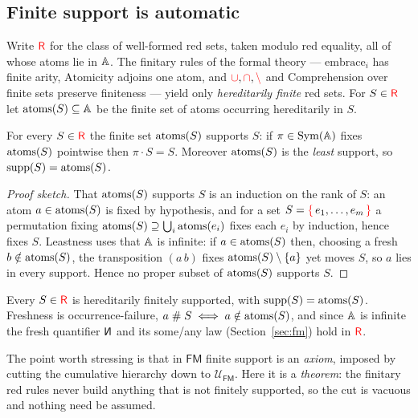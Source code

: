 \subsection{Finite support is automatic}
\label{sec:fmmodel:support}

Write $\textcolor{red}{\mathsf{R}}$ for the class of well-formed red sets, taken modulo red equality,
all of whose atoms lie in $\mathbb{A}$. The finitary rules of the formal theory ---
$\mathrm{embrace}_i$ has finite arity, $\mathrm{Atomicity}$ adjoins one atom, and
$\mathbin{\textcolor{red}{\cup}},\mathbin{\textcolor{red}{\cap}},\mathbin{\textcolor{red}{\setminus}}$ and $\mathrm{Comprehension}$ over finite sets preserve
finiteness --- yield only \emph{hereditarily finite} red sets. For $S\in\textcolor{red}{\mathsf{R}}$ let
$\mathrm{atoms}(S)\subseteq\mathbb{A}$ be the finite set of atoms occurring hereditarily in
$S$.

\begin{lemma}[Support]
\label{lem:support}
For every $S\in\textcolor{red}{\mathsf{R}}$ the finite set $\mathrm{atoms}(S)$ supports $S$: if
$\pi\in\mathrm{Sym}(\mathbb{A})$ fixes $\mathrm{atoms}(S)$ pointwise then $\pi\cdot S = S$.
Moreover $\mathrm{atoms}(S)$ is the \emph{least} support, so $\mathrm{supp}(S)=\mathrm{atoms}(S)$.
\end{lemma}

\begin{proof}[Proof sketch]
That $\mathrm{atoms}(S)$ supports $S$ is an induction on the rank of $S$: an atom
$a\in\mathrm{atoms}(S)$ is fixed by hypothesis, and for a set $S=\textcolor{red}{\{}\,e_1,\dots,e_m\,\textcolor{red}{\}}$ a
permutation fixing $\mathrm{atoms}(S)\supseteq\bigcup_i \mathrm{atoms}(e_i)$ fixes each $e_i$
by induction, hence fixes $S$. Leastness uses that $\mathbb{A}$ is infinite: if
$a\in\mathrm{atoms}(S)$ then, choosing a fresh $b\notin\mathrm{atoms}(S)$, the transposition
$(a\,b)$ fixes $\mathrm{atoms}(S)\setminus\{a\}$ yet moves $S$, so $a$ lies in every
support. Hence no proper subset of $\mathrm{atoms}(S)$ supports $S$.
\end{proof}

\begin{corollary}
\label{cor:hfs}
Every $S\in\textcolor{red}{\mathsf{R}}$ is hereditarily finitely supported, with
$\mathrm{supp}(S)=\mathrm{atoms}(S)$. Freshness is occurrence-failure,
$a\mathrel{\#}S \iff a\notin\mathrm{atoms}(S)$, and since $\mathbb{A}$ is infinite the
fresh quantifier $\new$ and its some/any law (Section~\ref{sec:fm}) hold in
$\textcolor{red}{\mathsf{R}}$.
\end{corollary}

The point worth stressing is that in $\mathsf{FM}$ finite support is an
\emph{axiom}, imposed by cutting the cumulative hierarchy down to
$\mathcal{U}_{\mathsf{FM}}$. Here it is a \emph{theorem}: the finitary red rules
never build anything that is not finitely supported, so the cut is vacuous and
nothing need be assumed.

